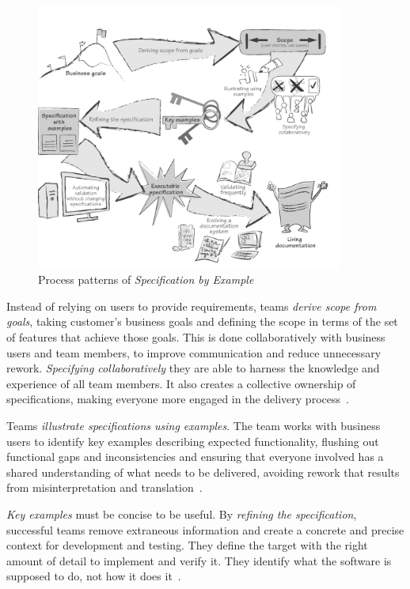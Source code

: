 \documentclass[dissertation,final]{softeng}
\begin{document}
\begin{figure}[h]
\includegraphics[width=0.9\textwidth]{SpecificationbyExample}
\centering
\caption[Specification by Example]{Process patterns of \emph{Specification by Example}~\citep{Adzic201106}}
\label{fig:specification_by_example}
\end{figure}

Instead of relying on users to provide requirements, teams \emph{derive scope from goals}, taking customer's business goals and defining the scope in terms of the set of features that achieve those goals. This is done collaboratively with business users and team members, to improve communication and reduce unnecessary rework. \emph{Specifying collaboratively} they are able to harness the knowledge and experience of all team members. It also creates a collective ownership of specifications, making everyone more engaged in the delivery process~\citep{Adzic201106}.

Teams \emph{illustrate specifications using examples}. The team works with business users to identify key examples describing expected functionality, flushing out functional gaps and inconsistencies and ensuring that everyone involved has a shared understanding of what needs to be delivered, avoiding rework that results from misinterpretation and translation~\citep{Adzic201106}.

\emph{Key examples} must be concise to be useful. By \emph{refining the specification}, successful teams remove extraneous information and create a concrete and precise context for development and testing. They define the target with the right amount of detail to implement and verify it. They identify what the software is supposed to do, not how it does it~\citep{Adzic201106}.
\end{document}
